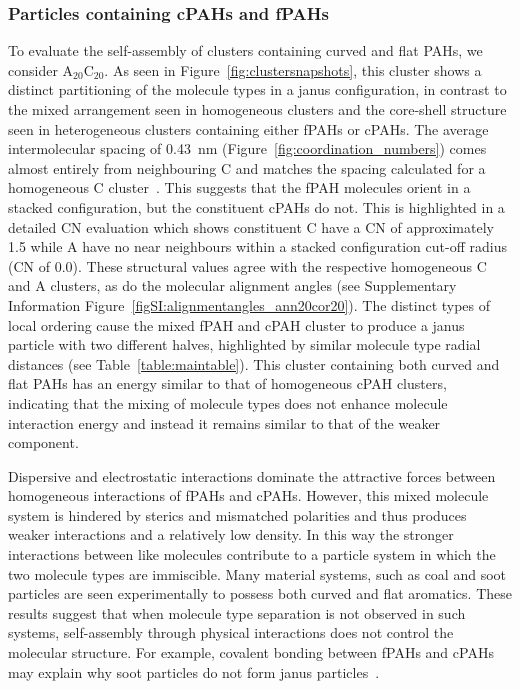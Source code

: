 \subsubsection{Particles containing cPAHs and fPAHs}
To evaluate the self-assembly of clusters containing curved and flat PAHs, we consider $\text{A}_{\text{20}}\text{C}_{\text{20}}$. As seen in Figure~\ref{fig:clustersnapshots}, this cluster shows a distinct partitioning of the molecule types in a janus configuration, in contrast to the mixed arrangement seen in homogeneous clusters and the core-shell structure seen in heterogeneous clusters containing either fPAHs or cPAHs. The average intermolecular spacing of 0.43~nm (Figure~\ref{fig:coordination_numbers}) comes almost entirely from neighbouring C and matches the spacing calculated for a homogeneous C cluster~\cite{chen2014phase}. This suggests that the fPAH molecules orient in a stacked configuration, but the constituent cPAHs do not. This is highlighted in a detailed CN evaluation which shows constituent C have a CN of approximately 1.5 while A have no near neighbours within a stacked configuration cut-off radius (CN of 0.0). These structural values agree with the respective homogeneous C and A clusters, as do the molecular alignment angles (see Supplementary Information Figure~\ref{figSI:alignmentangles_ann20cor20}). The distinct types of local ordering cause the mixed fPAH and cPAH cluster to produce a janus particle with two different halves, highlighted by similar molecule type radial distances (see Table~\ref{table:maintable}). This cluster containing both curved and flat PAHs has an energy similar to that of homogeneous cPAH clusters, indicating that the mixing of molecule types does not enhance molecule interaction energy and instead it remains similar to that of the weaker component.

Dispersive and electrostatic interactions dominate the attractive forces between homogeneous interactions of fPAHs and cPAHs. However, this mixed molecule system is hindered by sterics and mismatched polarities and thus produces weaker interactions and a relatively low density. In this way the stronger interactions between like molecules contribute to a particle system in which the two molecule types are immiscible. Many material systems, such as coal and soot particles are seen experimentally to possess both curved and flat aromatics. These results suggest that when molecule type separation is not observed in such systems, self-assembly through physical interactions does not control the molecular structure. For example, covalent bonding between fPAHs and cPAHs may explain why soot particles do not form janus particles~\cite{Pascazio2019mechanical,Pascazio2020}.
%

